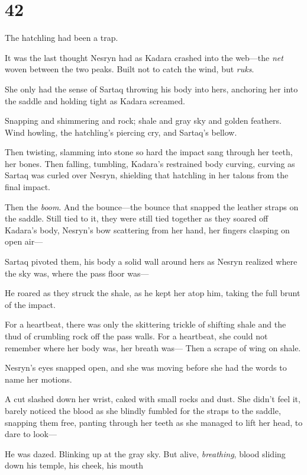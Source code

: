 
\chapter{42}

The hatchling had been a trap.

It was the last thought Nesryn had as Kadara crashed into the web---the \emph{net} woven between the two peaks.
Built not to catch the wind, but \emph{ruks}.

She only had the sense of Sartaq throwing his body into hers, anchoring her into the saddle and holding tight as Kadara screamed.

Snapping and shimmering and rock; shale and gray sky and golden feathers.
Wind howling, the hatchling's piercing cry, and Sartaq's bellow.

Then twisting, slamming into stone so hard the impact sang through her teeth, her bones.
Then falling, tumbling, Kadara's restrained body curving, curving as Sartaq was curled over Nesryn, shielding that hatchling in her talons from the final impact.

Then the \emph{boom}.
And the bounce---the bounce that snapped the leather straps on the saddle.
Still tied to it, they were still tied together as they soared off Kadara's body, Nesryn's bow scattering from her hand, her fingers clasping on open air---

Sartaq pivoted them, his body a solid wall around hers as Nesryn realized where the sky was, where the pass floor was---

He roared as they struck the shale, as he kept her atop him, taking the full brunt of the impact.

For a heartbeat, there was only the skittering trickle of shifting shale and the thud of crumbling rock off the pass walls.
For a heartbeat, she could not remember where her body was, her breath was--- Then a scrape of wing on shale.

Nesryn's eyes snapped open, and she was moving before she had the words to name her motions.

A cut slashed down her wrist, caked with small rocks and dust.
She didn't feel it, barely noticed the blood as she blindly fumbled for the straps to the saddle, snapping them free, panting through her teeth as she managed to lift her head, to dare to look---

He was dazed.
Blinking up at the gray sky.
But alive, \emph{breathing}, blood sliding down his temple, his cheek, his mouth 

